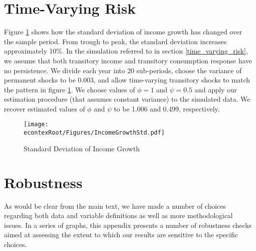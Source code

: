 \documentclass[titlepage]{\econtex}\newcommand{\texname}{ConsumptionHeterogeneity}
\begin{document}
\section{Time-Varying Risk} \label{time_varying_risk_appendix}
\setcounter{figure}{0}   
\setcounter{table}{0} 
Figure \ref{fig:income_growth_std} shows how the standard deviation of income growth has changed over the sample period. From trough to peak, the standard deviation increases approximately 10\%. In the simulation referred to in section \ref{time_varying_risk}, we assume that both transitory income and transitory consumption response have no persistence. We divide each year into 20 sub-periods, choose the variance of permanent shocks to be 0.003, and allow time-varying transitory shocks to match the pattern in figure \ref{fig:income_growth_std}. We choose values of $\phi=1$ and $\psi=0.5$ and apply our estimation procedure (that assumes constant variance) to the simulated data. We recover estimated values of $\phi$ and $\psi$ to be 1.006 and 0.499, respectively.
\begin{figure} 
	\begin{centering}
		\texttt{[image: \\econtexRoot/Figures/IncomeGrowthStd.pdf]}
		\caption{Standard Deviation of Income Growth}
		\label{fig:income_growth_std}
	\end{centering}
\end{figure}

\section{Robustness} \label{robustness}
As would be clear from the main text, we have made a number of choices regarding both data and variable definitions as well as more methodological issues. In a series of graphs, this appendix presents a number of robustness checks aimed at assessing the extent to which our results are sensitive to the specific choices. 
\end{document}
